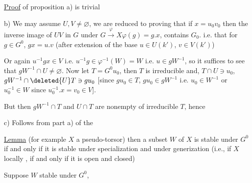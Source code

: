 
\uline{Proof} of proposition \qquad a) is trivial \qquad{}

b)  We may assume $U,V\ne\varnothing$,  we are reduced to proving that if  $x=u_0v_0$   then the inverse image of $UV$ in $G$ under $G\xrightarrow{\varphi}X$\quad $\varphi(g)=g.x$,  contains $G_0$. i.e. that for $g\in G^0$, \unsure{\ldots} $gx=u.v$ (after extension of the base  $u\in U(k')$, $v\in V(k')$)

 Or again $u^{-1}gx\in V$ i.e. $u^{-1}g\in\varphi^{-1}(W)=W$ i.e.  $u\in gW^{-1}$, so it suffices to see that $gW^{-1}\cap U\ne\varnothing$. Now let $T=G^0u_0$, then  $T$ is irreducible and,  $T\cap U\ni u_0$, $gW^{-1}\cap\deleted{U}T\ni gu_0$ [since $gu_0\in T$, $gu_0\in gW^{-1}$ i.e. $u_0\in W^{-1}$ or $u_0^{-1}\in W$ since $u_0^{-1}.x=v_0\in V$].

But then $gW^{-1}\cap T$ and $U\cap T$ are nonempty  of irreducible $T$, hence  

c) Follows from part a) of the

\uline{Lemma}    (for example $X$ a pseudo-torsor) then a subset $W$ of $X$ is stable under $G^0$ if and only if it is stable under specialization and under generization (i.e., if $X$ locally , if and only if it is open and closed)

  Suppose $W$ stable under $G^0$,       

